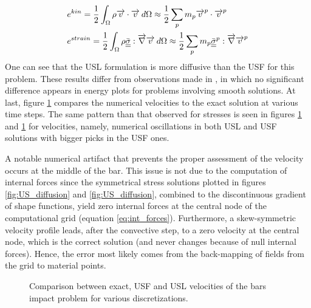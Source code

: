 \begin{align}
  & e^{kin}=\frac{1}{2}\int_\Omega \rho {\overrightarrow{v}}\cdot{\overrightarrow{v}} \:d\Omega \approx \frac{1}{2}\sum_p m_p {\overrightarrow{v}}^p\cdot{\overrightarrow{v}}^p\\
& e^{strain}= \frac{1}{2}\int_\Omega \rho {\underline{\underline{\bar{\sigma}}}}: {\overrightarrow{\nabla}} {\overrightarrow{v}} \:d\Omega \approx \frac{1}{2}\sum_p m_p {\underline{\underline{\bar{\sigma}}}}^p: {\overrightarrow{\nabla}} {\overrightarrow{v}}^p
\end{align}
One can see that the USL formulation is more diffusive than the USF for this problem. These results differ from observations made in \cite{Bardenhagen_USF_USL}, in which no significant difference appears in energy plots for problems involving smooth solutions. At last, figure \ref{fig:US_velocities} compares the numerical velocities to the exact solution at various time steps. The same pattern than that observed for stresses is seen in figures \ref{fig:US_velocities} and \ref{fig:US_velocities} for velocities, namely, numerical oscillations in both USL and USF solutions with bigger picks in the USF ones. 

A notable numerical artifact that prevents the proper assessment of the velocity occurs at the middle of the bar. This issue is not due to the computation of internal forces since the symmetrical stress solutions plotted in figures \ref{fig:US_diffusion} and \ref{fig:US_diffusion}, combined to the discontinuous gradient of shape functions, yield zero internal forces at the central node of the computational grid (equation \eqref{eq:int_forces}). Furthermore, a skew-symmetric velocity profile leads, after the convective step, to a zero velocity at the central node, which is the correct solution (and never changes because of null internal forces). Hence, the error most likely comes from the back-mapping of fields from the grid to material points. 
\begin{figure}[h!]
  \centering
  { \label{subfig:US_velo_10}}
  { \label{subfig:US_velo_25}}
  \caption{Comparison between exact, USF and USL velocities of the bars impact problem for various discretizations.}
  \label{fig:US_velocities}
\end{figure}

